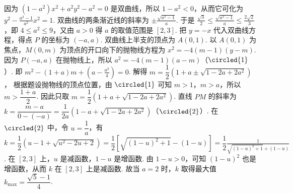 \begin{solution}
因为 \((1 - a^2)x^2 + a^2y^2 - a^2 = 0\) 是双曲线，所以 \(1-a^2<0\)，从而它可化为 \(y^2-\frac{a^2-1}{a^2}x^2=1\).
双曲线的两条渐近线的斜率为 \(\pm \frac{\sqrt{a^2 - 1}}{a}\). 于是 \(\frac{\sqrt{3}}{2} \leqslant \frac{\sqrt{a^2 - 1}}{a} \leqslant \frac{2\sqrt{2}}{3}\)，即 \(4 \leqslant a^2 \leqslant 9\)，又由 \(a > 0\) 得 \(a\) 的取值范围是 \([2,3]\).
把 \(y = -x\) 代入双曲线方程，得点 \(P\) 的坐标为 \((-a,a)\).
双曲线上半支的顶点为 \(A(0,1)\).
以 \(A(0,1)\) 为焦点，\(M(0,m)\) 为顶点的开口向下的抛物线方程为 \(x^2 = -4(m - 1)(y - m)\).
因为 \(P(-a,a)\) 在抛物线上，所以 \(a^2 = -4(m - 1)(a - m)\)（\(\circled{1}\)）.
即 \(m^2 - (1 + a)m + \left(a - \frac{a^2}{4}\right) = 0\). 解得 \(m = \dfrac{1}{2}\left(1 + a \pm \sqrt{1 - 2a + 2a^2}\right)\)，
根据题设抛物线的顶点位置，由 \(\circled{1}\) 可知 \(m > 1\)，\(m > a\)，所以 \(m > \dfrac{1 + a}{2}\).
因此只取 \(m = \dfrac{1}{2}\left(1 + a + \sqrt{1 - 2a + 2a^2}\right)\).
直线 \(PM\) 的斜率为 \(k = \dfrac{m - a}{0 - (-a)} = \dfrac{1}{2a}\left(1 - a + \sqrt{1 - 2a + 2a^2}\right)\)（\(\circled{2}\)）.
在 \(\circled{2}\) 中，令 \(u = \dfrac{1}{a}\)，有 \(k = \dfrac{1}{2}\left(u - 1 + \sqrt{u^2 - 2u + 2}\right) = \dfrac{1}{2}\left[\sqrt{(1 - u)^2 + 1} - (1 - u)\right] = \dfrac{1}{2}\frac{1}{\sqrt{(1 - u)^2 + 1} + (1 - u)}\).
在 \([2,3]\) 上，\(u\) 是减函数，\(1 - u\) 是增函数. 由 \(1 - u > 0\)，可知 \((1 - u)^2\) 也是增函数，从而 \(k\) 在 \([2,3]\) 上是减函数. 故当 \(a = 2\) 时，\(k\) 取得最大值 \(k_{\max} = \dfrac{\sqrt{5} - 1}{4}\).

\end{solution}
